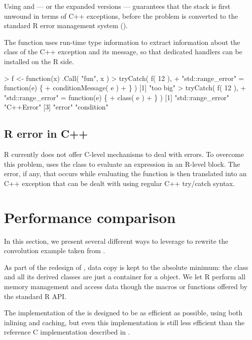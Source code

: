 Using  and  --- or the expanded versions ---
guarantees that the stack is first unwound in terms of C++ exceptions, before 
the problem is converted to the standard R error management system ().

The  function uses run-time type information to 
extract information about the class of the C++ exception and its message, so that 
dedicated handlers can be installed on the R side. 

\begin{example}
> f <- function(x) .Call( "fun", x )
> tryCatch( f( 12 ), 
+    "std::range_error" = function(e) \{
+       conditionMessage( e )
+    \} )
[1] "too big"
> tryCatch( f( 12 ), 
+    "std::range_error" = function(e) \{
+       class( e )
+    \} )
[1] "std::range_error" "C++Error"
[3] "error"            "condition" 
\end{example}

\subsection{R error in C++}

R currently does not offer C-level mechanisms to deal with errors. To 
overcome this problem,  uses the 
class to evaluate an expression in an R-level 
block. The error, if any, that occurs while evaluating the 
function is then translated into an C++ exception that can be dealt with using 
regular C++ try/catch syntax.

\section{Performance comparison}

In this section, we present several different ways to leverage  to 
rewrite the convolution example taken from \cite{R:exts}. 

As part of the redesign of , data copy is kept to the
absolute minimum: the  class and all its derived
classes are just a container for a  object. We let R perform
all memory management and access data though the macros or functions
offered by the standard R API. 

The implementation of the  is designed to be as 
efficient as possible, using both inlining and caching, 
but even this implementation is still less efficient than the 
reference C implementation described in \cite{R:exts}. 

